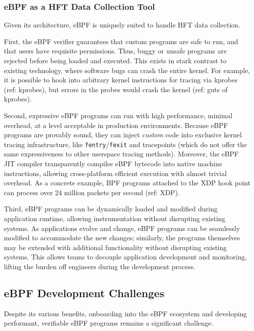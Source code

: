 \subsubsection{eBPF as a HFT Data Collection Tool}

Given its architecture, eBPF is uniquely suited to handle HFT data collection. 

First, the eBPF verifier guarantees that custom programs are safe to run, and that users have
requisite permissions. Thus, buggy or unsafe programs are rejected before being loaded and executed.
This exists in stark contrast to existing technology, where software bugs can crash the entire
kernel. For example, it is possible to hook into arbitrary kernel instructions for tracing via
kprobes (ref: kprobes), but errors in the probes would crash the kernel (ref: guts of kprobes).

Second, expressive eBPF programs can run with high performance, minimal overhead, at a level
acceptable in production environments. Because eBPF programs are provably sound, they can inject
\textit{custom} code into exclusive kernel tracing infrastructure, like
\texttt{fentry}/\texttt{fexit} and tracepoints (which do not offer the same expressiveness to other
userspace tracing methods). Moreover, the eBPF JIT compiler transparently compiles eBPF bytecode
into native machine instructions, allowing cross-platform efficient execution with almost trivial
overhead. As a concrete example, BPF programs attached to the XDP hook point can process over 24
million packets per second (ref: XDP).

Third, eBPF programs can be dynamically loaded and modified during application runtime, allowing
instrumentation without disrupting existing systems. As applications evolve and change, eBPF
programs can be seamlessly modified to accommodate the new changes; similarly, the programs
themselves may be extended with additional functionality without disrupting existing systems. This
allows teams to decouple application development and monitoring, lifting the burden off engineers
during the development process.

\subsection{eBPF Development Challenges}

Despite its various benefits, onboarding into the eBPF ecosystem and developing performant,
verifiable eBPF programs remains a significant challenge.

